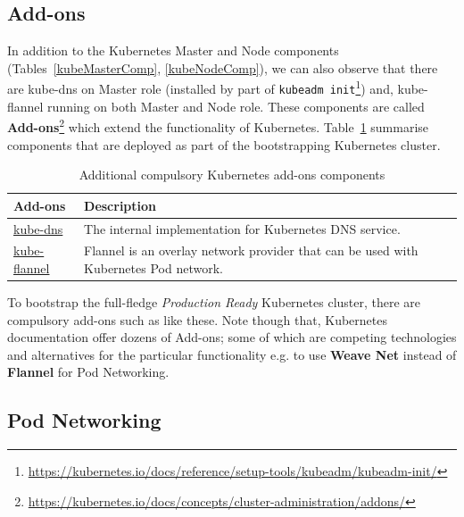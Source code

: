\subsection{Add-ons}

In addition to the Kubernetes Master and Node components (Tables~\ref{kubeMasterComp}, \ref{kubeNodeComp}), we can also observe that there are kube-dns on Master role (installed by part of \verb|kubeadm init|\footnote{\url{https://kubernetes.io/docs/reference/setup-tools/kubeadm/kubeadm-init/}}) and, kube-flannel running on both Master and Node role. These components are called \textbf{Add-ons}\footnote{\url{https://kubernetes.io/docs/concepts/cluster-administration/addons/}} which extend the functionality of Kubernetes. Table~\ref{kubeadmAddons} summarise components that are deployed as part of the bootstrapping Kubernetes cluster.

\begin{table}[H]
\centering
    \begin{tabular}{ | l | p{11cm} |}
    \hline
    Add-ons & Description \\ \hline
    \href{https://github.com/kubernetes/kubernetes/tree/master/cluster/addons/dns/kube-dns}{kube-dns} & The internal implementation for Kubernetes DNS service. \\ \hline
   \href{https://github.com/coreos/flannel}{kube-flannel} & Flannel is an overlay network provider that can be used with Kubernetes Pod network. \\ 
    \hline
    \end{tabular}
\caption{Additional compulsory Kubernetes add-ons components}
\label{kubeadmAddons}  
\end{table}

\noindent To bootstrap the full-fledge \emph{Production Ready} Kubernetes cluster, there are compulsory add-ons such as like these. Note though that, Kubernetes documentation \parencite{kubeDoc} offer dozens of Add-ons; some of which are competing technologies and alternatives for the particular functionality e.g. to use \textbf{Weave Net} instead of \textbf{Flannel} for Pod Networking.

\subsection{Pod Networking}

